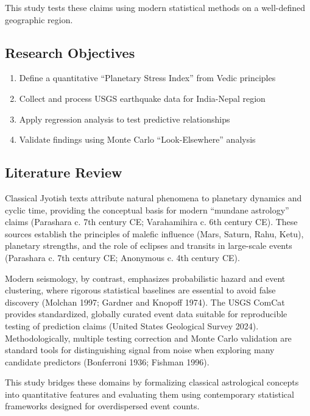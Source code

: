 \documentclass[
  11pt,
  a4paper,
  oneside,
  openany]{article}
\providecommand{\tightlist}{%
  \setlength{\itemsep}{0pt}\setlength{\parskip}{0pt}}\usepackage{longtable,booktabs,array}
\begin{document}
This study tests these claims using modern statistical methods on a
well-defined geographic region.

\subsection{Research Objectives}\label{research-objectives}

\begin{enumerate}
\def\labelenumi{\arabic{enumi}.}
\tightlist
\item
  Define a quantitative ``Planetary Stress Index'' from Vedic principles
\item
  Collect and process USGS earthquake data for India-Nepal region
\item
  Apply regression analysis to test predictive relationships
\item
  Validate findings using Monte Carlo ``Look-Elsewhere'' analysis
\end{enumerate}

\subsection{Literature Review}\label{literature-review}

Classical Jyotish texts attribute natural phenomena to planetary
dynamics and cyclic time, providing the conceptual basis for modern
``mundane astrology'' claims (Parashara c. 7th century CE; Varahamihira
c. 6th century CE). These sources establish the principles of malefic
influence (Mars, Saturn, Rahu, Ketu), planetary strengths, and the role
of eclipses and transits in large-scale events (Parashara c. 7th century
CE; Anonymous c. 4th century CE).

Modern seismology, by contrast, emphasizes probabilistic hazard and
event clustering, where rigorous statistical baselines are essential to
avoid false discovery (Molchan 1997; Gardner and Knopoff 1974). The USGS
ComCat provides standardized, globally curated event data suitable for
reproducible testing of prediction claims (United States Geological
Survey 2024). Methodologically, multiple testing correction and Monte
Carlo validation are standard tools for distinguishing signal from noise
when exploring many candidate predictors (Bonferroni 1936; Fishman
1996).

This study bridges these domains by formalizing classical astrological
concepts into quantitative features and evaluating them using
contemporary statistical frameworks designed for overdispersed event
counts.
\end{document}
